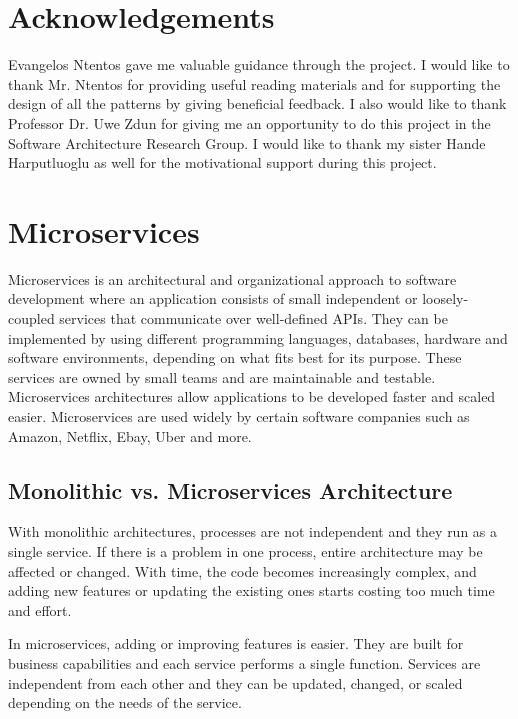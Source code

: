 \documentclass{article}
\begin{document}
\pagebreak


\section*{Acknowledgements}
Evangelos Ntentos gave me valuable guidance through the project. I would like to thank Mr. Ntentos for providing useful reading materials and for supporting the design of all the patterns by giving beneficial feedback. I also would like to thank Professor Dr. Uwe Zdun for giving me an opportunity to do this project in the Software Architecture Research Group. I would like to thank my sister Hande Harputluoglu as well for the motivational support during this project.  
\clearpage

\tableofcontents

\pagebreak


\section{Microservices}

Microservices is an architectural and organizational approach to software development where an application consists of small independent or loosely-coupled services that communicate over well-defined APIs\cite{amazon}. They can be implemented by using different programming languages, databases, hardware and software environments, depending on what fits best for its purpose\cite{intro}. These services are owned by small teams and are maintainable and testable. Microservices architectures allow applications to be developed faster and scaled easier\cite{intro}. Microservices are used widely by certain software companies such as Amazon, Netflix, Ebay, Uber and more.   

\subsection{Monolithic vs. Microservices Architecture}

With monolithic architectures, processes are not independent and they run as a single service\cite{amazon}. If there is a problem in one process, entire architecture may be affected or changed. With time, the code becomes increasingly complex, and adding new features or updating the existing ones starts costing too much time and effort\cite{mono}.
\bigbreak

\noindent In microservices, adding or improving features is easier. They are built for business capabilities and each service performs a single function. Services are independent from each other and they can be updated, changed, or scaled depending on the needs of the service\cite{amazon, book}.
\end{document}
